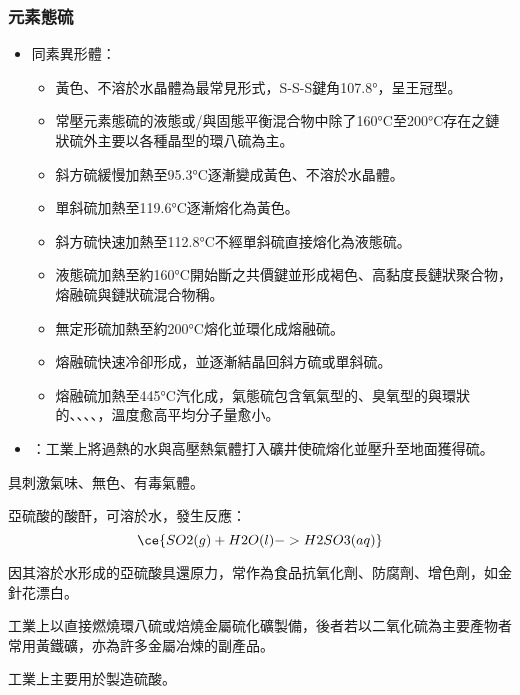\documentclass[a4paper,12pt]{report}
\begin{document}
\subsubsection{元素態硫}
\begin{itemize}
\item 同素異形體：
\begin{itemize}
\item 黃色、不溶於水晶體為最常見形式，S-S-S鍵角107.8°，呈王冠型。
\item 常壓元素態硫的液態或/與固態平衡混合物中除了160°C至200°C存在之鏈狀硫外主要以各種晶型的環八硫為主。
\item 斜方硫緩慢加熱至95.3°C逐漸變成黃色、不溶於水晶體。
\item 單斜硫加熱至119.6°C逐漸熔化為黃色。
\item 斜方硫快速加熱至112.8°C不經單斜硫直接熔化為液態硫。
\item 液態硫加熱至約160°C開始斷之共價鍵並形成褐色、高黏度長鏈狀聚合物，熔融硫與鏈狀硫混合物稱。
\item 無定形硫加熱至約200°C熔化並環化成熔融硫。
\item 熔融硫快速冷卻形成，並逐漸結晶回斜方硫或單斜硫。
\item 熔融硫加熱至445°C汽化成，氣態硫包含氧氣型的、臭氧型的與環狀的、、、、，溫度愈高平均分子量愈小。
\end{itemize}
\item {}：工業上將過熱的水與高壓熱氣體打入礦井使硫熔化並壓升至地面獲得硫。
\end{itemize}
\bit
\item 具刺激氣味、無色、有毒氣體。
\item 亞硫酸的酸酐，可溶於水，發生反應：
\[\ce{SO2(g) + H2O(l) -> H2SO3(aq)}\]
\item 因其溶於水形成的亞硫酸具還原力，常作為食品抗氧化劑、防腐劑、增色劑，如金針花漂白。
\item 工業上以直接燃燒環八硫或焙燒金屬硫化礦製備，後者若以二氧化硫為主要產物者常用黃鐵礦，亦為許多金屬冶煉的副產品。
\item 工業上主要用於製造硫酸。
\eit
\end{document}
